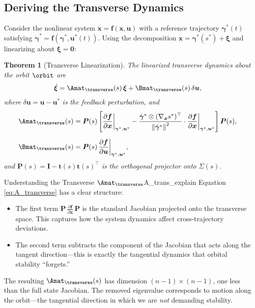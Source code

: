 \documentclass[12pt, openany]{book}
\theoremstyle{plain}
\newtheorem{theorem}{Theorem}[chapter]
\newcommand{\state}{\bm{x}}
\newcommand{\control}{\bm{u}}
\newcommand{\traj}{\bm{\gamma}}
\newcommand{\norm}[1]{\left\lVert #1 \right\rVert}
\begin{document}
\subsection{Deriving the Transverse Dynamics}

Consider the nonlinear system $\dot{\state} = \bm{f}(\state, \control)$
with a reference trajectory $\traj^*(t)$ satisfying
$\dot{\traj}^* = \bm{f}(\traj^*, \control^*(t))$. Using the decomposition
$\state = \traj^*(s^*) + \bm{\xi}$ and linearizing about $\bm{\xi} = \bm{0}$:

\begin{theorem}[Transverse Linearization]\label{thm:transverse_lin}
  The linearized transverse dynamics about the orbit $\orbit$ are
  \begin{equation}\label{eq:transverse_linear}
    \dot{\bm{\xi}} = \Amat_\transverse(s)\, \bm{\xi}
    + \Bmat_\transverse(s)\, \delta\control,
  \end{equation}
  where $\delta\control = \control - \control^*$ is the feedback perturbation, and
  \begin{align}
    \Amat_\transverse(s) &= \bm{P}(s) \left[
      \frac{\partial \bm{f}}{\partial \state}\bigg|_{\traj^*, \control^*}
      - \frac{\dot{\traj}^* \otimes (\nabla_{\state} s^*)^\top}
      {\norm{\dot{\traj}^*}^2} \cdot
      \frac{\partial \bm{f}}{\partial \state}\bigg|_{\traj^*, \control^*}
    \right] \bm{P}(s), \label{eq:A_transverse} \\[6pt]
    \Bmat_\transverse(s) &= \bm{P}(s)\,
      \frac{\partial \bm{f}}{\partial \control}\bigg|_{\traj^*, \control^*},
      \label{eq:B_transverse}
  \end{align}
  and $\bm{P}(s) = \bm{I} - \bm{t}(s)\bm{t}(s)^\top$ is the orthogonal
  projector onto $\Sigma(s)$.
\end{theorem}

\begin{remark}{Understanding the Transverse $\Amat_\transverse$}{A_trans_explain}
  Equation \eqref{eq:A_transverse} has a clear structure:
  \begin{itemize}[leftmargin=1cm]
    \item The first term $\bm{P}\, \frac{\partial \bm{f}}{\partial \state}\, \bm{P}$
      is the standard Jacobian projected onto the transverse space. This
      captures how the system dynamics affect cross-trajectory deviations.
    \item The second term subtracts the component of the Jacobian that acts along
      the tangent direction---this is exactly the tangential dynamics that
      orbital stability ``forgets.''
  \end{itemize}
  The resulting $\Amat_\transverse(s)$ has dimension $(n{-}1) \times (n{-}1)$,
  one less than the full state Jacobian. The removed eigenvalue corresponds
  to motion along the orbit---the tangential direction in which we are
  \emph{not} demanding stability.
\end{remark}
\end{document}
